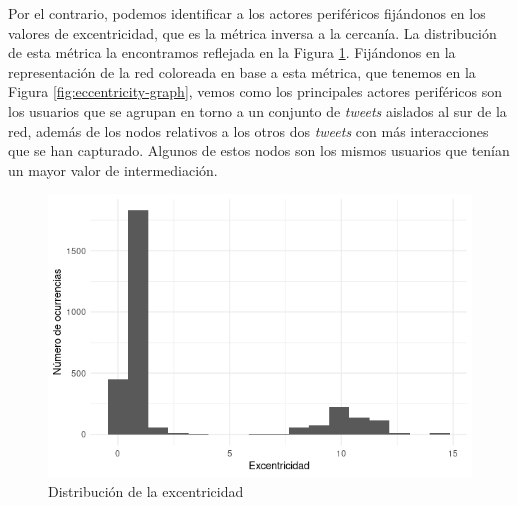 Por el contrario, podemos identificar a los actores periféricos fijándonos en
los valores de excentricidad, que es la métrica inversa a la cercanía. La
distribución de esta métrica la encontramos reflejada en la Figura
\ref{fig:eccentricity-plot}. Fijándonos en la representación de la red coloreada
en base a esta métrica, que tenemos en la Figura \ref{fig:eccentricity-graph},
vemos como los principales actores periféricos son los usuarios que se agrupan
en torno a un conjunto de \textit{tweets} aislados al sur de la red, además de
los nodos relativos a los otros dos \textit{tweets} con más interacciones que se
han capturado. Algunos de estos nodos son los mismos usuarios que tenían un
mayor valor de intermediación.

\begin{figure}
    \centering
    \includegraphics[width=\textwidth]{images/plots/eccentricity.png}
    \caption{Distribución de la excentricidad}
    \label{fig:eccentricity-plot}
\end{figure}

